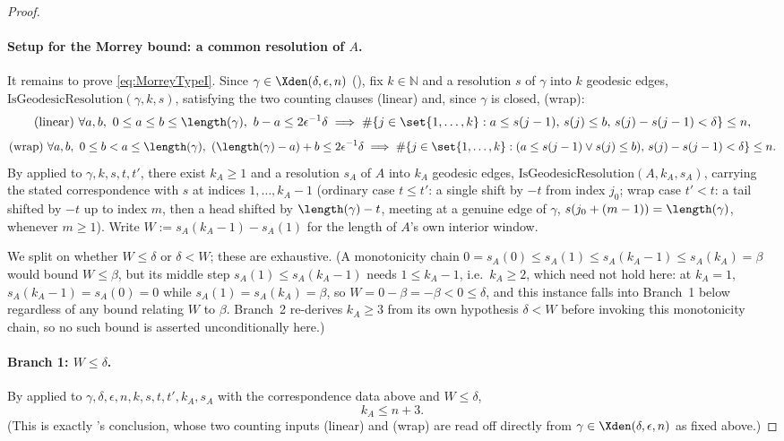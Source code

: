 \begin{proof}
  \paragraph{Setup for the Morrey bound: a common resolution of $A$.} It remains to prove
  \eqref{eq:MorreyTypeI}. Since $\gamma\in\Xden(\delta,\epsilon,n)$ (), fix
  $k\in\mathbb{N}$ and a resolution $s$ of $\gamma$ into $k$ geodesic edges,
  $\mathrm{IsGeodesicResolution}(\gamma,k,s)$, satisfying the two counting clauses (linear) and,
  since $\gamma$ is closed, (wrap):
  \[
    \text{(linear)}\ \forall a,b,\ 0\le a\le b\le\length(\gamma),\ b-a\le2\epsilon^{-1}\delta
    \implies \#\{j\in\set{1,\dots,k}:a\le s(j-1),\,s(j)\le b,\,s(j)-s(j-1)<\delta\}\le n ,
  \]
  \[
    \text{(wrap)}\ \forall a,b,\ 0\le b<a\le\length(\gamma),\ (\length(\gamma)-a)+b\le2\epsilon^{-1}
    \delta \implies \#\{j\in\set{1,\dots,k}:(a\le s(j-1)\vee s(j)\le b),\,s(j)-s(j-1)<\delta\}\le n
    .
  \]
  By  applied to $\gamma,k,s,t,t'$, there exist $k_A\ge1$ and a
  resolution $s_A$ of $A$ into $k_A$ geodesic edges, $\mathrm{IsGeodesicResolution}(A,k_A,s_A)$,
  carrying the stated correspondence with $s$ at indices $1,\dots,k_A-1$ (ordinary case $t\le t'$:
  a single shift by $-t$ from index $j_0$; wrap case $t'<t$: a tail shifted by $-t$ up to index $m$,
  then a head shifted by $\length(\gamma)-t$, meeting at a genuine edge of $\gamma$,
  $s(j_0+(m-1))=\length(\gamma)$, whenever $m\ge1$). Write $W := s_A(k_A-1)-s_A(1)$ for the length
  of $A$'s own interior window.

  We split on whether $W\le\delta$ or $\delta<W$; these are exhaustive. (A monotonicity chain
  $0=s_A(0)\le s_A(1)\le s_A(k_A-1)\le s_A(k_A)=\beta$ would bound $W\le\beta$, but its middle step
  $s_A(1)\le s_A(k_A-1)$ needs $1\le k_A-1$, i.e.\ $k_A\ge2$, which need not hold here: at $k_A=1$,
  $s_A(k_A-1)=s_A(0)=0$ while $s_A(1)=s_A(k_A)=\beta$, so $W=0-\beta=-\beta<0\le\delta$, and this
  instance falls into Branch~1 below regardless of any bound relating $W$ to $\beta$. Branch~2
  re-derives $k_A\ge3$ from its own hypothesis $\delta<W$ before invoking this monotonicity chain,
  so no such bound is asserted unconditionally here.)

  \paragraph{Branch 1: $W\le\delta$.} By  applied to
  $\gamma,\delta,\epsilon,n,k,s,t,t',k_A,s_A$ with the correspondence data above and $W\le\delta$,
  \[
    k_A \le n+3
    .
  \]
  (This is exactly 's conclusion, whose two counting inputs
  (linear) and (wrap) are read off directly from $\gamma\in\Xden(\delta,\epsilon,n)$ as fixed
  above.)


\end{proof}
